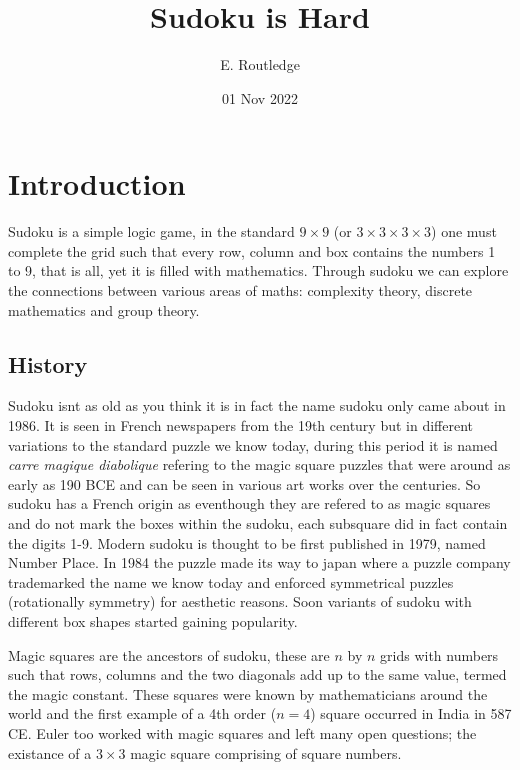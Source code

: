\documentclass[a4paper,11pt]{report}
\author{E. Routledge}
\date{01 Nov 2022}
\title{Sudoku is Hard}
\newcounter{row}
\newcounter{col}
\begin{document}
\lstset{language=Python}

\tableofcontents
\chapter{Introduction}

Sudoku is a simple logic game, in the standard $9 \times 9$ (or $3 \times 3 \times 3 \times 3$) one must complete the grid such that every row, column and box contains the numbers 1 to 9, that is all, yet it is filled with mathematics. Through sudoku we
can explore the connections between various areas of maths: complexity theory, discrete mathematics and group theory.

\section{History}

Sudoku isnt as old as you think it is in fact the name sudoku only came about in 1986. It is seen in French newspapers from the 19th century but in different variations to the standard puzzle we know today, during this period it is named \textit{carre magique diabolique} refering to the magic square puzzles that were around as early as 190 BCE and can be seen in various art works over the centuries. So sudoku has a French origin as eventhough they are refered to as magic squares and do not mark the boxes within the sudoku, each subsquare did in fact contain the digits 1-9. Modern sudoku is thought to be first published in 1979, named Number Place. In 1984 the puzzle made its way to japan where a puzzle company trademarked the name we know today and enforced symmetrical puzzles (rotationally symmetry) for aesthetic reasons. Soon variants of sudoku with different box shapes started gaining popularity.

Magic squares are the ancestors of sudoku, these are $n$ by $n$ grids with numbers such that rows, columns and the two diagonals add up to the same value, termed the magic constant. These squares were known by mathematicians around the world and the first example of a 4th order ($n=4$) square occurred in India in 587 CE. Euler too worked with magic squares and left many open questions; the existance of a $3\times 3$ magic square comprising of square numbers.
\end{document}
